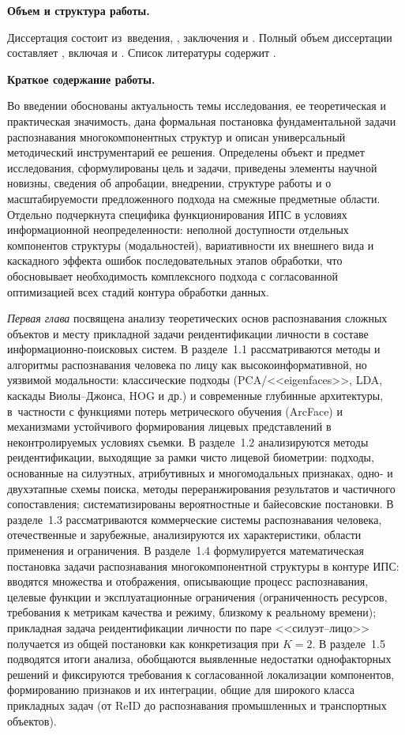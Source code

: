 \textbf{Объем и структура работы.}

Диссертация состоит из~введения,
,
заключения и
.
Полный объем диссертации составляет
, включая
 и
.
Список литературы содержит
.

\textbf{Краткое содержание работы.}

Во введении обоснованы актуальность темы исследования, ее теоретическая и
практическая значимость, дана формальная постановка фундаментальной задачи
распознавания многокомпонентных структур и описан универсальный
методический инструментарий ее решения. Определены объект и предмет
исследования, сформулированы цель и задачи, приведены элементы научной
новизны, сведения об апробации, внедрении, структуре работы и о
масштабируемости предложенного подхода на смежные предметные области.
Отдельно подчеркнута специфика функционирования ИПС в условиях
информационной неопределенности: неполной доступности отдельных
компонентов структуры (модальностей), вариативности их внешнего вида и
каскадного эффекта ошибок последовательных этапов обработки, что
обосновывает необходимость комплексного подхода с согласованной
оптимизацией всех стадий контура обработки данных.

\emph{Первая глава} посвящена анализу теоретических основ распознавания
сложных объектов и месту прикладной задачи реидентификации личности
в составе информационно‑поисковых систем. В разделе~1.1 рассматриваются
методы и алгоритмы распознавания человека по лицу как высокоинформативной,
но уязвимой модальности: классические подходы (PCA/<<eigenfaces>>, LDA,
каскады Виолы--Джонса, HOG и др.) и современные глубинные архитектуры,
в~частности с функциями потерь метрического обучения (ArcFace) и
механизмами устойчивого формирования лицевых представлений в
неконтролируемых условиях съемки. В разделе~1.2 анализируются методы
реидентификации, выходящие за рамки чисто лицевой биометрии: подходы,
основанные на силуэтных, атрибутивных и многомодальных признаках,
одно‑ и двухэтапные схемы поиска, методы переранжирования результатов
и частичного сопоставления; систематизированы вероятностные и
байесовские постановки. В разделе~1.3 рассматриваются коммерческие
системы распознавания человека, отечественные и зарубежные,
анализируются их характеристики, области применения и ограничения.
В разделе~1.4 формулируется математическая постановка задачи распознавания
многокомпонентной структуры в контуре ИПС: вводятся множества и
отображения, описывающие процесс распознавания, целевые функции и
эксплуатационные ограничения (ограниченность ресурсов, требования к
метрикам качества и режиму, близкому к реальному времени);
прикладная задача реидентификации личности по паре <<силуэт--лицо>>
получается из общей постановки как конкретизация при $K=2$. В разделе~1.5
подводятся итоги анализа, обобщаются выявленные недостатки однофакторных
решений и фиксируются требования к согласованной локализации компонентов,
формированию признаков и их интеграции, общие для широкого класса
прикладных задач (от ReID до распознавания промышленных и транспортных
объектов).

